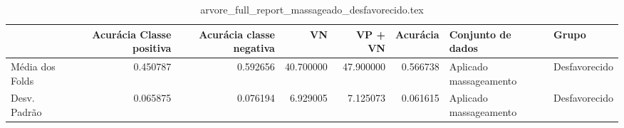 \begin{table}
\centering
\caption{arvore_full_report_massageado_desfavorecido.tex}
\label{arvore_full_report_massageado_desfavorecido.tex}
\begin{tabular}{lrrrrrll}
\toprule
{}              &  Acurácia Classe positiva &  Acurácia classe negativa &        VN  &   VP + VN  &  Acurácia &       Conjunto de dados &          Grupo \\
\midrule
Média dos Folds &                  0.450787 &                  0.592656 &  40.700000 &  47.900000 &  0.566738 &  Aplicado massageamento &  Desfavorecido \\
Desv. Padrão    &                  0.065875 &                  0.076194 &   6.929005 &   7.125073 &  0.061615 &  Aplicado massageamento &  Desfavorecido \\
\bottomrule
\end{tabular}
\end{table}
